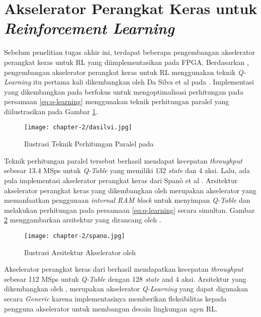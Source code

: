 \section{Akselerator Perangkat Keras untuk \textit{Reinforcement Learning}}

Sebelum penelitian tugas akhir ini, terdapat beberapa pengembangan akselerator perangkat keras untuk \ac{RL} yang diimplementasikan pada \ac{FPGA}. Berdasarkan \parencite{sutisna2023faraneq}, pengembangan akselerator perangkat keras untuk \ac{RL} menggunakan teknik \textit{Q-Learning} itu pertama kali dikembangkan oleh Da Silva et al pada \parencite{dasilva2019parallel}. Implementasi yang dikembangkan pada \parencite{dasilva2019parallel} berfokus untuk mengoptimalisasi perhitungan pada persamaan \ref{eq:q-learning} menggunakan teknik perhitungan paralel yang diilustrasikan pada Gambar \ref{fig:ilustrasi-dasilvi}.


\begin{figure}[h]
	\centering
	\texttt{[image: chapter-2/dasilvi.jpg]}
	\caption{Ilustrasi Teknik Perhitungan Paralel pada \parencite{dasilva2019parallel}}
	\label{fig:ilustrasi-dasilvi}
\end{figure}

Teknik perhitungan paralel tersebut berhasil mendapat kecepatan \textit{throughput} sebesar 13.4  \ac{MSps} untuk \textit{Q-Table} yang memiliki 132 \textit{state} dan 4 aksi. Lalu, ada pula implementasi akselerator perangkat keras dari Spanò et al \parencite{spano2019efficient}. Arsitektur akselerator perangkat keras yang dikembangkan oleh \parencite{spano2019efficient} merupakan akselerator yang memanfaatkan penggunaan \textit{internal RAM block} untuk menyimpan \textit{Q-Table} dan melakukan perhitungan pada persamaan \ref{eq:q-learning} secara simultan. Gambar \ref{fig:ilustrasi-spano} menggambarkan arsitektur yang dirancang oleh \parencite{spano2019efficient}.

\begin{figure}[h]
	\centering
	\texttt{[image: chapter-2/spano.jpg]}
	\caption{Ilustrasi Arsitektur Akselerator oleh \parencite{spano2019efficient}}
	\label{fig:ilustrasi-spano}
\end{figure}

Akselerator perangkat keras dari \parencite{spano2019efficient} berhasil mendapatkan kecepatan \textit{throughput} sebesar 112 MSps untuk \textit{Q-Table} dengan 128 \textit{state} and 4 aksi. Arsitektur yang dikembangkan oleh \parencite{spano2019efficient}, merupakan akselerator \textit{Q-Learning} yang dapat digunakan secara \textit{Generic} karena implementasinya memberikan fleksibilitas kepada pengguna akselerator untuk membangun desain lingkungan agen \ac{RL}.

